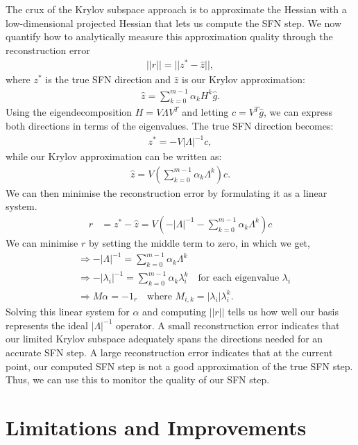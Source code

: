 The crux of the Krylov subspace approach is to approximate the Hessian with a low-dimensional projected Hessian that lets us compute the SFN step. We now quantify how to analytically measure this approximation quality through the reconstruction error
\begin{align}
    ||r|| = ||z^* - \hat{z}||,
\end{align}
where $z^*$ is the true SFN direction and $\hat{z}$ is our Krylov approximation:
\begin{align}
    \hat{z} = \sum_{k=0}^{m-1} \alpha_k H^k \hat{g}.
\end{align}
Using the eigendecomposition $H = V \Lambda V^T$ and letting $c = V^T \hat{g}$, we can express both directions in terms of the eigenvalues. The true SFN direction becomes:
\begin{align}
    z^* = -V |\Lambda|^{-1} c,
\end{align}
while our Krylov approximation can be written as:
\begin{align}
    \hat{z} = V \left(\sum_{k=0}^{m-1} \alpha_k \Lambda^k\right) c.
\end{align}
We can then minimise the reconstruction error by formulating it as a linear system.
\begin{align}
    r &= z^* - \hat{z} = V(-|\Lambda|^{-1} - \sum_{k=0}^{m-1} \alpha_k \Lambda^k)c
\end{align}
We can minimise $r$ by setting the middle term to zero, in which we get,
\begin{align}
    &\Rightarrow -|\Lambda|^{-1} = \sum_{k=0}^{m-1} \alpha_k \Lambda^k \\
    &\Rightarrow -|\lambda_i|^{-1} = \sum_{k=0}^{m-1} \alpha_k \lambda_i^k \quad \text{for each eigenvalue } \lambda_i \\
    &\Rightarrow M\alpha = -1_r \quad \text{where } M_{i,k} = |\lambda_i| \lambda_i^k.
\end{align}
Solving this linear system for $\alpha$ and computing $||r||$ tells us how well our basis represents the ideal $|\Lambda|^{-1}$ operator. A small reconstruction error indicates that our limited Krylov subspace adequately spans the directions needed for an accurate SFN step. A large reconstruction error indicates that at the current point, our computed SFN step is not a good approximation of the true SFN step. Thus, we can use this to monitor the quality of our SFN step.

\section{Limitations and Improvements}
\label{sec:limitations}

